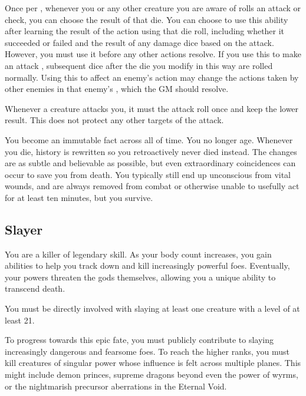        Once per , whenever you or any other creature you are aware of rolls an attack or check, you can choose the result of that die.
      You can choose to use this ability after learning the result of the action using that die roll, including whether it succeeded or failed and the result of any damage dice based on the attack.
      However, you must use it before any other actions resolve.
      If you use this to make an attack , subsequent dice after the die you modify in this way are rolled normally.
      Using this to affect an enemy's action may change the actions taken by other enemies in that enemy's , which the GM should resolve.

       Whenever a creature attacks you, it must  the attack roll once and keep the lower result.
      This does not protect any other targets of the attack.

       You become an immutable fact across all of time.
      You no longer age.
      Whenever you die, history is rewritten so you retroactively never died instead.
      The changes are as subtle and believable as possible, but even extraordinary coincidences can occur to save you from death.
      You typically still end up unconscious from vital wounds, and are always removed from combat or otherwise unable to usefully act for at least ten minutes, but you survive.

  \subsection{Slayer}
    You are a killer of legendary skill.
    As your body count increases, you gain abilities to help you track down and kill increasingly powerful foes.
    Eventually, your powers threaten the gods themselves, allowing you a unique ability to transcend death.

     You must be directly involved with slaying at least one  creature with a level of at least 21.

     To progress towards this epic fate, you must publicly contribute to slaying increasingly dangerous and fearsome foes.
    To reach the higher ranks, you must kill creatures of singular power whose influence is felt across multiple planes.
    This might include demon princes, supreme dragons beyond even the power of wyrms, or the nightmarish precursor aberrations in the Eternal Void.

